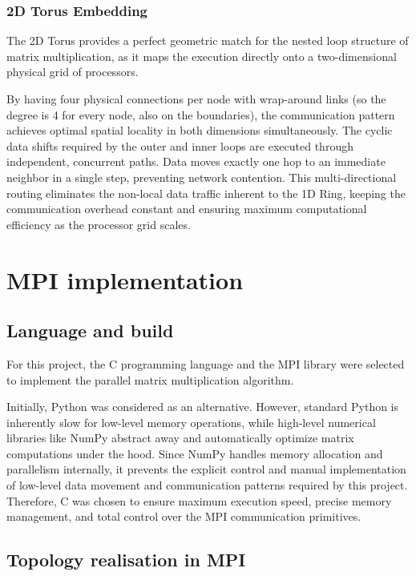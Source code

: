 \documentclass[
  12pt,
]{article}
\begin{document}
\subsubsection{2D Torus Embedding}\label{d-torus-embedding}

The 2D Torus provides a perfect geometric match for the nested loop
structure of matrix multiplication, as it maps the execution directly
onto a two-dimensional physical grid of processors.

By having four physical connections per node with wrap-around links (so
the degree is 4 for every node, also on the boundaries), the
communication pattern achieves optimal spatial locality in both
dimensions simultaneously. The cyclic data shifts required by the outer
and inner loops are executed through independent, concurrent paths. Data
moves exactly one hop to an immediate neighbor in a single step,
preventing network contention. This multi-directional routing eliminates
the non-local data traffic inherent to the 1D Ring, keeping the
communication overhead constant and ensuring maximum computational
efficiency as the processor grid scales.

\section{MPI implementation}\label{mpi-implementation}

\subsection{Language and build}\label{language-and-build}

For this project, the C programming language and the MPI library were
selected to implement the parallel matrix multiplication algorithm.

Initially, Python was considered as an alternative. However, standard
Python is inherently slow for low-level memory operations, while
high-level numerical libraries like NumPy abstract away and
automatically optimize matrix computations under the hood. Since NumPy
handles memory allocation and parallelism internally, it prevents the
explicit control and manual implementation of low-level data movement
and communication patterns required by this project. Therefore, C was
chosen to ensure maximum execution speed, precise memory management, and
total control over the MPI communication primitives.

\subsection{Topology realisation in
MPI}\label{topology-realisation-in-mpi}
\end{document}
